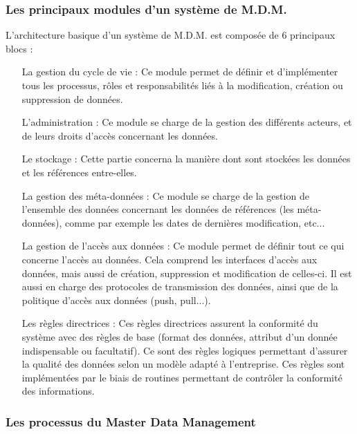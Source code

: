 \subsubsection{Les principaux modules d'un système de M.D.M.}

L'architecture basique d'un système de M.D.M. est composée de 6 principaux blocs :

\begin{itemize}

\item[La gestion du cycle de vie : ]
Ce module permet de définir et d'implémenter tous les processus, rôles et responsabilités liés à la modification, création ou suppression de données.

\item[L'administration : ]
Ce module se charge de la gestion des différents acteurs, et de leurs droits d'accès concernant les données.

\item[Le stockage : ]
Cette partie concerna la manière dont sont stockées les données et les références entre-elles.

\item[La gestion des méta-données : ]
Ce module se charge de la gestion de l'ensemble des données concernant les données de références (les méta-données), comme par exemple les dates de dernières modification, etc...

\item[La gestion de l'accès aux données : ]
Ce module permet de définir tout ce qui concerne l'accès au données. Cela comprend les interfaces d'accès aux données, mais aussi de création, suppression et modification de celles-ci. Il est aussi en charge des protocoles de transmission des données, ainsi que de la politique d'accès aux données (push, pull...).

\item[Les règles directrices : ]
Ces règles directrices assurent la conformité du système avec des règles de base (format des données, attribut d'un donnée indispensable ou facultatif). Ce sont des règles logiques permettant d'assurer la qualité des données selon un modèle adapté à l'entreprise. Ces règles sont implémentées par le biais de routines permettant de contrôler la conformité des informations.

\end{itemize}

\subsubsection{Les processus du Master Data Management}

